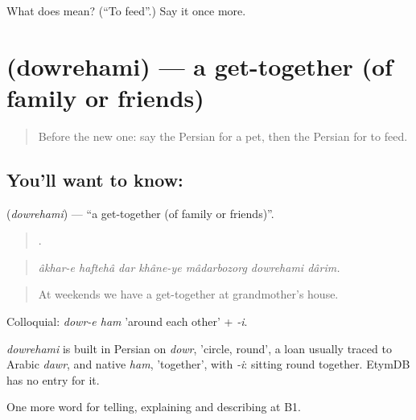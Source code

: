 \begin{tcolorbox}[breakable,colback=teal!4,colframe=teal!35!black,title={Before you move on}]
What does   mean? (\textquotedblleft{}To feed\textquotedblright{}.) Say it once more.
\end{tcolorbox}
\section[\texorpdfstring{\fa{دورهمی} (dowrehami)}{دورهمی (dowrehami)}]{ (dowrehami) — a get-together (of family or friends)}

\label{lesson:FA-C539-dowrehami}



\begin{quote}
Before the new one: say the Persian for a pet, then the Persian for to feed.
\end{quote}

\subsection*{You'll want to know: }
\textbf{} (\emph{dowrehami}) — \textquotedblleft{}a get-together (of family or friends)\textquotedblright{}.

\begin{quote}
       .
\end{quote}

\begin{quote}
\emph{âkhar-e haftehâ dar khâne-ye mâdarbozorg dowrehami dârim.}
\end{quote}

\begin{quote}
At weekends we have a get-together at grandmother's house.
\end{quote}

Colloquial: \emph{dowr-e ham} 'around each other' + \emph{-i}.

\begin{cousinweb}
\emph{dowrehami} is built in Persian on \emph{dowr}, 'circle, round', a loan usually traced to Arabic \emph{dawr}, and native \emph{ham}, 'together', with \emph{-i}: sitting round together. EtymDB has no entry for it.
\end{cousinweb}

\begin{grammarlens}[title={What you've built}]
One more word for telling, explaining and describing at B1.
\end{grammarlens}

